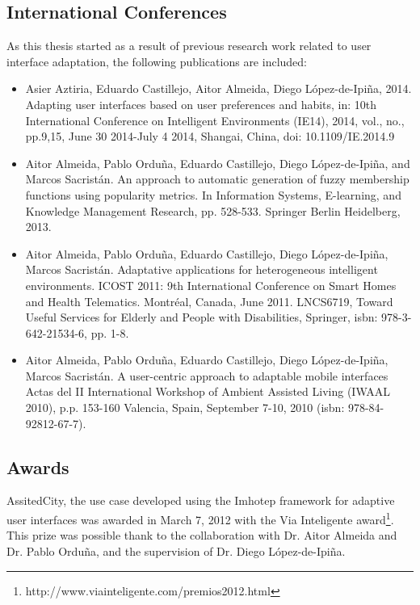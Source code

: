 \subsection{International Conferences}

As this thesis started as a result of previous research work related to user 
interface adaptation, the following publications are included:

\begin{itemize}
  \item Asier Aztiria, Eduardo Castillejo, Aitor Almeida, Diego {López-de-Ipiña}, 
  2014. Adapting user interfaces based on user preferences and habits, in: 
  10th International Conference on Intelligent Environments (IE14), 2014, vol., 
  no., pp.9,15, June 30 2014-July 4 2014, Shangai, China, \acs{doi}: 10.1109/IE.2014.9

  \item Aitor Almeida, Pablo Orduña, Eduardo Castillejo, Diego {López-de-Ipiña}, 
  and Marcos Sacristán. An approach to automatic generation of fuzzy 
  membership functions using popularity metrics. In Information Systems, 
  E-learning, and Knowledge Management Research, pp. 528-533. Springer Berlin 
  Heidelberg, 2013.
  
  \item Aitor Almeida, Pablo Orduña, Eduardo Castillejo, Diego {López-de-Ipiña}, 
  Marcos Sacristán. Adaptative applications for heterogeneous intelligent 
  environments. ICOST 2011: 9th International Conference on Smart Homes and 
  Health Telematics. Montréal, Canada, June 2011. LNCS6719, Toward Useful 
  Services for Elderly and People with Disabilities, Springer, \ac{isbn}: 
  978-3-642-21534-6, pp. 1-8.
  
  \item Aitor Almeida, Pablo Orduña, Eduardo Castillejo, Diego {López-de-Ipiña}, 
  Marcos Sacristán. A user-centric approach to adaptable mobile interfaces 
  Actas del II International Workshop of Ambient Assisted Living (IWAAL 2010), 
  p.p. 153-160 Valencia, Spain, September 7-10, 2010 (\ac{isbn}: 978-84-92812-67-7).
\end{itemize}


\subsection{Awards}
\label{sec:awards}

AssitedCity, the use case developed using the Imhotep framework for adaptive
user interfaces was awarded in March 7, 2012 with the Via Inteligente 
award\footnote{http://www.viainteligente.com/premios2012.html}. This prize was 
possible thank to the collaboration with Dr. Aitor Almeida and Dr. Pablo Orduña, 
and the supervision of Dr. Diego López-de-Ipiña. 
